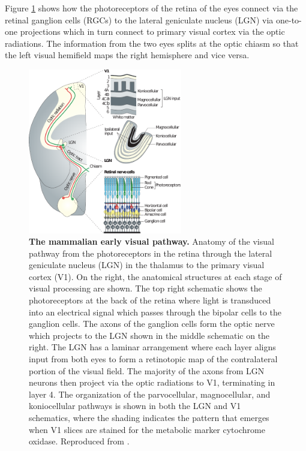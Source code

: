 \documentclass[phd,ianc,twoside]{infthesis}
\begin{document}
Figure \ref{fig:basic_anatomy} shows how the photoreceptors of the
retina of the eyes connect via the retinal ganglion cells (RGCs) to the
lateral geniculate nucleus (LGN) via one-to-one projections which in
turn connect to primary visual cortex via the optic radiations. The
information from the two eyes splits at the optic chiasm so that the
left visual hemifield maps the right hemisphere and vice versa.

\begin{figure}
\center
\includegraphics[width=0.6\textwidth]{./figures/basic_anatomy.pdf}
\caption{{\bf The mammalian early visual pathway.} Anatomy of the visual
  pathway from the photoreceptors in the retina through the lateral
  geniculate nucleus (LGN) in the thalamus to the primary visual cortex
  (V1). On the right, the anatomical structures at each stage of visual
  processing are shown. The top right schematic shows the photoreceptors
  at the back of the retina where light is transduced into an electrical
  signal which passes through the bipolar cells to the ganglion
  cells. The axons of the ganglion cells form the optic nerve which
  projects to the LGN shown in the middle schematic on the right. The
  LGN has a laminar arrangement where each layer aligns input from both
  eyes to form a retinotopic map of the contralateral portion of the
  visual field. The majority of the axons from LGN neurons then project
  via the optic radiations to V1, terminating in layer 4. The
  organization of the parvocellular, magnocellular, and koniocellular
  pathways is shown in both the LGN and V1 schematics, where the shading
  indicates the pattern that emerges when V1 slices are stained for
  the metabolic marker cytochrome oxidase. Reproduced from
  \citet{solomon_naturerev07}.}
\label{fig:basic_anatomy}
\end{figure}
\end{document}
